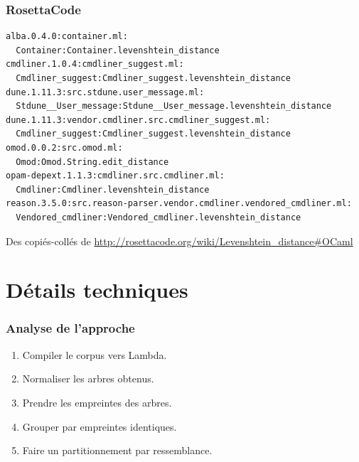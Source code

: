 \documentclass[11pt]{beamer}
\begin{document}
\begin{frame}[fragile]
\frametitle{RosettaCode}
\begin{Verbatim}[fontsize=\footnotesize]
alba.0.4.0:container.ml:
  Container:Container.levenshtein_distance
cmdliner.1.0.4:cmdliner_suggest.ml:
  Cmdliner_suggest:Cmdliner_suggest.levenshtein_distance
dune.1.11.3:src.stdune.user_message.ml:
  Stdune__User_message:Stdune__User_message.levenshtein_distance
dune.1.11.3:vendor.cmdliner.src.cmdliner_suggest.ml:
  Cmdliner_suggest:Cmdliner_suggest.levenshtein_distance
omod.0.0.2:src.omod.ml:
  Omod:Omod.String.edit_distance
opam-depext.1.1.3:cmdliner.src.cmdliner.ml:
  Cmdliner:Cmdliner.levenshtein_distance
reason.3.5.0:src.reason-parser.vendor.cmdliner.vendored_cmdliner.ml:
  Vendored_cmdliner:Vendored_cmdliner.levenshtein_distance
\end{Verbatim}
Des copiés-collés de \url{http://rosettacode.org/wiki/Levenshtein_distance#OCaml}
\end{frame}

\section{Détails techniques}

\begin{frame}
\frametitle{Analyse de l'approche}
	\begin{enumerate}
	\item Compiler le corpus vers Lambda.
	\item Normaliser les arbres obtenus.
	\item Prendre les empreintes des arbres.
	\item Grouper par empreintes identiques.
	\item Faire un partitionnement par ressemblance.
\end{enumerate}
\end{frame}
\end{document}
